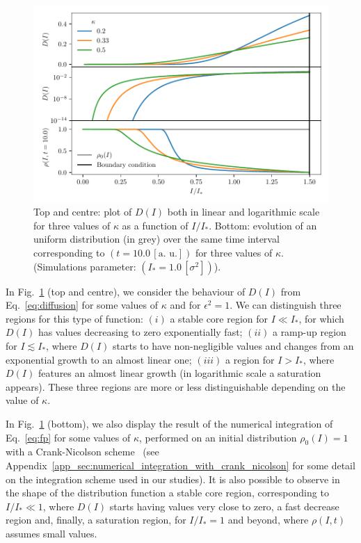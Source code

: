 \begin{figure}[t]
    \centering
    \includegraphics[width=\textwidth]{4_probing_the_diffusive_behavior/figs/diffusion_coefficient.pdf}
    \caption{Top and centre: plot of $D(I)$ both in linear and logarithmic scale for three values of $\kappa$ as a function of $I/I_\ast$.
    Bottom: evolution of an uniform distribution (in grey) over the same time interval corresponding to $(t=10.0 \, [\text{a. u.}])$ for three values of $\kappa$. (Simulations parameter: $(I_\ast = 1.0\,[\sigma^2])$).}
    \label{fig:1}
\end{figure}

In Fig.~\ref{fig:1} (top and centre), we consider the behaviour of $D(I)$ from Eq.~\eqref{eq:diffusion} for some values of $\kappa$ and for $\epsilon^2 = 1$. We can distinguish three regions for this type of function: $(i)$ a stable core region for $I \ll I_\ast$, for which $D(I)$ has values decreasing to zero exponentially fast; $(ii)$ a ramp-up region for $I \lesssim I_\ast$, where $D(I)$ starts to have non-negligible values and changes from an exponential growth to an almost linear one; $(iii)$ a region for $I >  I_\ast$, where $D(I)$ features an almost linear growth (in logarithmic scale a saturation appears). These three regions are more or less distinguishable depending on the value of $\kappa$. 

In Fig.~\ref{fig:1} (bottom), we also display the result of the numerical integration of Eq.~\eqref{eq:fp} for some values of $\kappa$, performed on an initial distribution $\rho_0(I)=1$ with a Crank-Nicolson scheme~\cite{crank1947practical} (see Appendix~\ref{app_sec:numerical_integration_with_crank_nicolson} for some detail on the integration scheme used in our studies).
It is also possible to observe in the shape of the distribution function a stable core region, corresponding to $I/I_\ast \ll 1$, where $D(I)$ starts having values very close to zero, a fast decrease region and, finally, a saturation region, for $I/I_\ast = 1$ and beyond, where $\rho(I, t)$ assumes small values.




